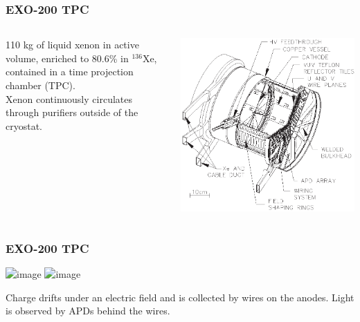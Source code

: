 \documentclass{beamer}
\begin{document}
\begin{frame}
\begin{center}
\frametitle{EXO-200 TPC}
\end{center}
\vspace{1cm}
\begin{columns}[onlytextwidth]
\begin{column}{.25\textwidth}
110 kg of liquid xenon in active volume, enriched to 80.6\% in $^{136}$Xe, contained in a time projection chamber (TPC).\\[\baselineskip]
Xenon continuously circulates through purifiers outside of the cryostat.
\end{column}
\begin{column}{.75\textwidth}
\includegraphics[keepaspectratio=true,width=\textwidth]{TPCSchematic.eps}
\end{column}
\end{columns}
\end{frame}

\begin{frame}
\begin{center}
\frametitle{EXO-200 TPC}
\end{center}
\parbox [t][70mm]{\textwidth}{ %
\begin{center}
\includegraphics<1>[keepaspectratio=true,width=.8\textwidth]{ChargeDrift2DModel.png}
\includegraphics<2>[keepaspectratio=true,width=\textwidth]{PlatterWGO7.png}
\end{center}
}
Charge drifts under an electric field and is collected by wires on the anodes.  Light is observed by APDs behind the wires.
\end{frame}
\end{document}
